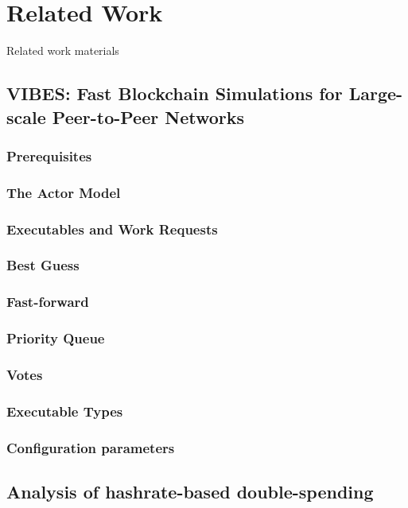 \chapter{Related Work}
\label{chapter:relatedWork}

Related work materials 
\section{VIBES: Fast Blockchain Simulations for Large-scale Peer-to-Peer
Networks}
\subsection{Prerequisites}
\subsection{The Actor Model}
\subsection{Executables and Work Requests}
\subsection{Best Guess}
\subsection{Fast-forward}
\subsection{Priority Queue}
\subsection{Votes}
\subsection{Executable Types}
\subsection{Configuration parameters}
\section{Analysis of hashrate-based double-spending}
